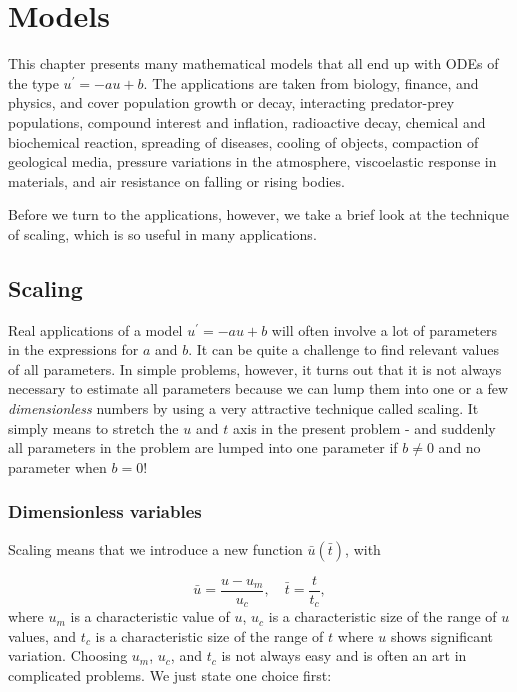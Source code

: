\documentclass[graybox,sectrefs,envcountresetchap,open=right,final]{svmonodo}
\begin{document}
\chapter{Models}
\label{decay:app}

This chapter presents many mathematical models that all end up with
ODEs of the type $u^{\prime}=-au+b$.  The applications are taken from
biology, finance, and physics, and cover population growth or decay,
interacting predator-prey populations, compound interest and
inflation, radioactive decay, chemical and biochemical reaction,
spreading of diseases, cooling of objects, compaction of geological
media, pressure variations in the atmosphere, viscoelastic response in
materials, and air resistance on falling or rising bodies.

Before we turn to the applications, however, we take a brief look at
the technique of scaling, which is so useful in many applications.


\section{Scaling}
\label{decay:app:scaling}

Real applications of a model $u^{\prime}=-au+b$ will often involve a lot
of parameters in the expressions for $a$ and $b$. It can be quite
a challenge to find relevant values of all parameters. In simple
problems, however, it turns out that it is not always necessary
to estimate all parameters because we can lump them into one or
a few \emph{dimensionless} numbers by using a very attractive technique
called scaling. It simply means to stretch the $u$ and $t$ axis
in the present problem - and suddenly all parameters in the problem
are lumped into one parameter if $b\neq 0$ and no parameter when $b=0$!

\subsection{Dimensionless variables}

Scaling means that we introduce a new function $\bar u(\bar t)$,
with

\[ \bar u = \frac{u - u_m}{u_c},\quad \bar t = \frac{t}{t_c},\]
where $u_m$ is a characteristic value of $u$, $u_c$ is a characteristic
size of the range of $u$ values, and $t_c$ is a characteristic
size of the range of $t$ where $u$ shows significant variation.
Choosing $u_m$, $u_c$, and $t_c$ is not always easy and is often an art
in complicated problems. We just state one choice first:
\end{document}
